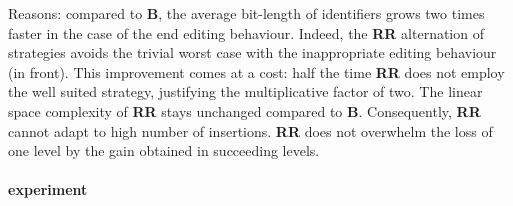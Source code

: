 \begin{asparadesc}
  \item[Reasons:] compared to \textbf{B}, the average bit-length of identifiers
    grows two times faster in the case of the end editing behaviour. Indeed,
    the \textbf{RR} alternation of strategies avoids the trivial worst case
    with the inappropriate editing behaviour (in front). This improvement comes
    at a cost: half the time \textbf{RR} does not employ the well suited
    strategy, justifying the multiplicative factor of two. The linear
    space complexity of \textbf{RR} stays unchanged compared to
    \textbf{B}. Consequently, \textbf{RR} cannot adapt to high number of
    insertions. \textbf{RR} does not overwhelm the loss of one level by the
    gain obtained in succeeding levels.
\end{asparadesc}



\paragraph{\textbf{\NAME{}} experiment}

